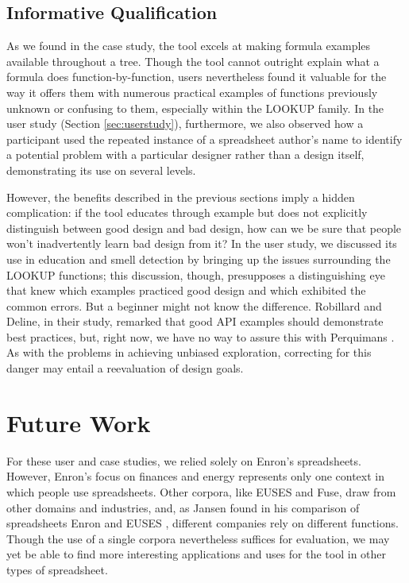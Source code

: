 \documentclass[conference]{IEEEtran}
\newcommand{\toolname}{Perquimans }
\begin{document}
	\subsection{Informative Qualification} As we found in the case study, the tool
	excels at making formula examples available throughout a tree. Though the tool
	cannot outright explain what a formula does function-by-function, users
	nevertheless found it valuable for the way it offers them with numerous
	practical examples of functions previously unknown or confusing to them,
	especially within the LOOKUP family. In the user study (Section
	\ref{sec:userstudy}), furthermore, we also observed how a participant used the
	repeated instance of a spreadsheet author's name to identify a potential
	problem with a particular designer rather than a design itself, demonstrating
	its use on several levels. \par
	
	However, the benefits described in the previous sections imply a hidden
	complication: if the tool educates through example but does not explicitly
	distinguish between good design and bad design, how can we be sure that people
	won’t inadvertently learn bad design from it? In the user study, we discussed
	its use in education and smell detection by bringing up the issues surrounding
	the LOOKUP functions; this discussion, though, presupposes a distinguishing eye
	that knew which examples practiced good design and which exhibited the common
	errors. But a beginner might not know the difference. Robillard and Deline, in
	their study, remarked that good API examples should demonstrate best practices,
	but, right now, we have no way to assure this with \toolname. As with the
	problems in achieving unbiased exploration, correcting for this danger may
	entail a reevaluation of design goals.
	
	\section{Future Work} For these user and case studies, we relied solely on
	Enron's spreadsheets. However, Enron's focus on finances and energy represents
	only one context in which people use spreadsheets. Other corpora, like EUSES
	and Fuse, draw from other domains and industries, and, as Jansen found in his
	comparison of spreadsheets Enron and EUSES \cite{jansen2015enron}, different
	companies rely on different functions. Though the use of a single corpora
	nevertheless suffices for evaluation, we may yet be able to find more
	interesting applications and uses for the tool in other types of spreadsheet.
	\par
	
\end{document}
